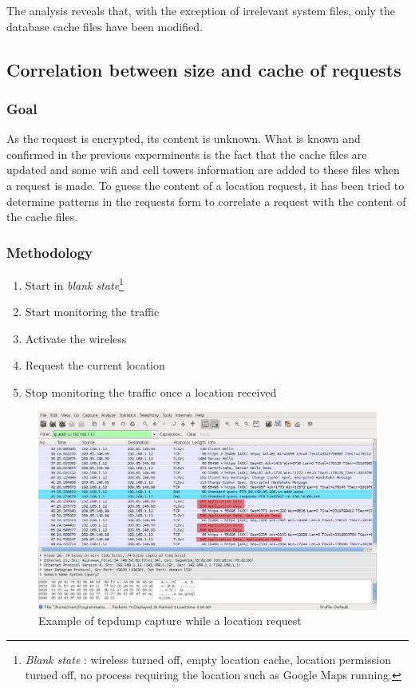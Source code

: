 The analysis reveals that, with the exception of irrelevant system files, only the database cache files have been modified.\\

\subsection{Correlation between size and cache of requests}

\subsubsection{Goal}

As the request is encrypted, its content is unknown.
What is known and confirmed in the previous experminents is the fact that the cache files are updated and some wifi and cell towers information are added to these files when a request is made.
To guess the content of a location request, it has been tried to determine patterns in the requests form to correlate a request with the content of the cache files.

\subsubsection{Methodology}

\begin{enumerate}
\item Start in \emph{blank state}\footnote{\emph{Blank state} : wireless turned off, empty location cache, location permission turned off, no process requiring the location such as Google Maps running.}
\item Start monitoring the traffic
\item Activate the wireless
\item Request the current location
\item Stop monitoring the traffic once a location received
\end{enumerate}

\begin{figure}[h]
  \hspace*{-2cm}
  \centering
  \includegraphics[width=17cm]{images/trace2.png}
  \caption{Example of tcpdump capture while a location request}
  \label{fig:loc-req-tcpdump}
\end{figure}


